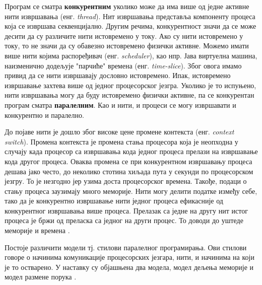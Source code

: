\documentclass[12pt,oneside]{memoir}
\begin{document}
Програм се сматра \textbf{конкурентним} уколико може да има више од једне активне нити извршавања  (енг. \textit{thread}). Нит извршавања представља компоненту процеса која се извршава секвенцијално. Другим речима, конкурентност значи да се може десити да су различите нити истовремено у току. Ако су нити истовремено у току, то не значи да су обавезно истовремено физички активне. Можемо имати више нити којима распоређивач (енг. \textit{scheduler}), као нпр. Јава виртуелна машина, наизменично додељује "парчиће" времена (енг. \textit{time-slice}). Због овога имамо привид да се нити извршавају дословно истовремено. Ипак, истовремено извршавање захтева више од једног процесорског језгра. Уколико је то испуњено, нити извршавања могу да буду истовремено физички активне, па се конкурентан програм сматра \textbf{паралелним}. Као и нити, и процеси се могу извршавати и конкурентно и паралелно.

До појаве нити је дошло због високе цене промене контекста (енг. \textit{context switch}). Промена контекста је промена стања процесора која је неопходна у случају када процесор са извршавања кода једног процеса прелази на извршавање кода другог процеса. Оваква промена се при конкурентном извршавању процеса дешава јако често, до неколико стотина хиљада пута у секунди по процесорском језгру. То је незгодно јер узима доста процесорског времена. Такође, подаци о стању процеса заузимају много меморије. Нити могу делити податке између себе, тако да је конкурентно извршавање нити једног процеса ефикасније од конкурентног извршавања више процеса. Прелазак са једне на другу нит истог процеса је бржи од преласка са једног на други процес. То доводи до уштеде меморије и времена  \cite{progLangPragm, konkMalkov, survey}.

Постоје различити модели тј. стилови паралелног програмирања. Ови стилови говоре о начинима комуникације процесорских језгара, нити, и начинима на који је то остварено. У наставку су објашњена два модела, модел дељења меморије и модел размене порука \cite{survey}.
 
\end{document}
